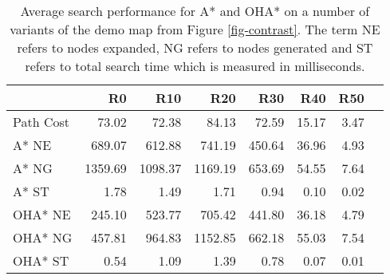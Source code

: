 \begin{table}
\begin{center}
\label{table-csc2f}
\begin{tabular}{@{}lrrrrrrr@{}}
  \hline
 & R0 & R10 & R20 & R30 & R40 & R50 \\ 
  \hline
Path Cost & 73.02 & 72.38 & 84.13 & 72.59 & 15.17 & 3.47 \\ 
A* NE & 689.07 & 612.88 & 741.19 & 450.64 & 36.96 & 4.93 \\ 
A* NG & 1359.69 & 1098.37 & 1169.19 & 653.69 & 54.55 & 7.64 \\ 
A* ST & 1.78 & 1.49 & 1.71 & 0.94 & 0.10 & 0.02 \\ 
OHA* NE & 245.10 & 523.77 & 705.42 & 441.80 & 36.18 & 4.79 \\ 
OHA* NG & 457.81 & 964.83 & 1152.85 & 662.18 & 55.03 & 7.54 \\ 
OHA* ST & 0.54 & 1.09 & 1.39 & 0.78 & 0.07 & 0.01 \\ 
   \hline
\end{tabular}
\caption{Average search performance for A* and OHA* on a number of variants of the demo
map from Figure \ref{fig-contrast}.
The term NE refers to nodes expanded, NG refers to nodes generated and ST refers to total 
search time which is measured in milliseconds.}
\end{center}
\end{table}
